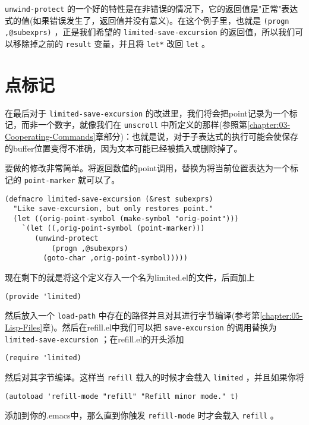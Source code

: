  \texttt{unwind-protect} 的一个好的特性是在非错误的情况下，它的返回值是"正常"表达式的值(如果错误发生了，返回值并没有意义)。在这个例子里，也就是 \texttt{(progn ,@subexprs)} ，正是我们希望的 \texttt{limited-save-excursion} 的返回值，所以我们可以移除掉之前的 \texttt{result} 变量，并且将 \texttt{let*} 改回 \texttt{let} 。

\section{点标记}
\label{section:08-Point-Marker}

在最后对于 \texttt{limited-save-excursion} 的改进里，我们将会把point记录为一个标记，而非一个数字，就像我们在 \texttt{unscroll} 中所定义的那样(参照第\ref{chapter:03-Cooperating-Commands}章部分)：也就是说，对于子表达式的执行可能会使保存的buffer位置变得不准确，因为文本可能已经被插入或删除掉了。

要做的修改非常简单。将返回数值的point调用，替换为将当前位置表达为一个标记的 \texttt{point-marker} 就可以了。

\begin{verbatim}
(defmacro limited-save-excursion (&rest subexprs)
  "Like save-excursion, but only restores point."
  (let ((orig-point-symbol (make-symbol "orig-point")))
    `(let ((,orig-point-symbol (point-marker)))
       (unwind-protect
           (progn ,@subexprs)
         (goto-char ,orig-point-symbol)))))
\end{verbatim}

现在剩下的就是将这个定义存入一个名为limited.el的文件，后面加上

\begin{verbatim}
(provide 'limited)
\end{verbatim}

然后放入一个 \texttt{load-path} 中存在的路径并且对其进行字节编译(参考第\ref{chapter:05-Lisp-Files}章)。然后在refill.el中我们可以把 \texttt{save-excursion} 的调用替换为 \texttt{limited-save-excursion} ；在refill.el的开头添加

\begin{verbatim}
(require 'limited)
\end{verbatim}

然后对其字节编译。这样当 \texttt{refill} 载入的时候才会载入 \texttt{limited} ，并且如果你将

\begin{verbatim}
(autoload 'refill-mode "refill" "Refill minor mode." t)
\end{verbatim}

添加到你的.emacs中，那么直到你触发 \texttt{refill-mode} 时才会载入 \texttt{refill} 。
